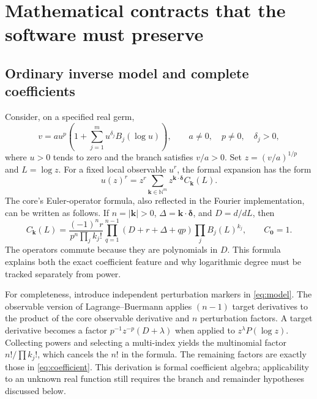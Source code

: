 \documentclass[11pt,a4paper]{article}
\newcommand{\N}{\mathbb N}
\begin{document}
\section{Mathematical contracts that the software must preserve}
\label{sec:contracts}
\subsection{Ordinary inverse model and complete coefficients}
Consider, on a specified real germ,
\begin{equation}
 v=a u^p\left(1+\sum_{j=1}^{m}u^{\delta_j}B_j(\log u)\right),
 \qquad a\ne0,\quad p\ne0,\quad \delta_j>0,
 \label{eq:model}
\end{equation}
where $u>0$ tends to zero and the branch satisfies $v/a>0$. Set
$z=(v/a)^{1/p}$ and $L=\log z$. For a fixed local observable $u^r$, the
formal expansion has the form
\begin{equation}
 u(z)^r=z^r\sum_{\boldsymbol{k}\in\N^m}
 z^{\boldsymbol{k}\cdot\boldsymbol\delta}C_{\boldsymbol{k}}(L).
 \label{eq:inverse}
\end{equation}
The core's Euler-operator formula, also reflected in the Fourier
implementation, can be written as follows. If $n=|\boldsymbol{k}|>0$,
$\Delta=\boldsymbol{k}\cdot\boldsymbol\delta$, and $D=d/dL$, then
\begin{equation}
 C_{\boldsymbol{k}}(L)=
 \frac{(-1)^n r}{p^n\prod_j k_j!}
 \prod_{q=1}^{n-1}\left(D+r+\Delta+qp\right)
 \prod_j B_j(L)^{k_j},
 \qquad C_{\boldsymbol0}=1.
 \label{eq:coefficient}
\end{equation}
The operators commute because they are polynomials in $D$. This formula
explains both the exact coefficient feature and why logarithmic degree
must be tracked separately from power.\cite{core,fourier}

For completeness, introduce independent perturbation markers in
\eqref{eq:model}. The observable version of Lagrange--Buermann applies
$(n-1)$ target derivatives to the product of the core observable derivative
and $n$ perturbation factors. A target derivative becomes a factor
$p^{-1}z^{-p}(D+\lambda)$ when applied to $z^\lambda P(\log z)$.
Collecting powers and selecting a multi-index yields the multinomial factor
$n!/\prod k_j!$, which cancels the $n!$ in the formula. The remaining
factors are exactly those in \eqref{eq:coefficient}. This derivation is
formal coefficient algebra; applicability to an unknown real function still
requires the branch and remainder hypotheses discussed below.
\end{document}
